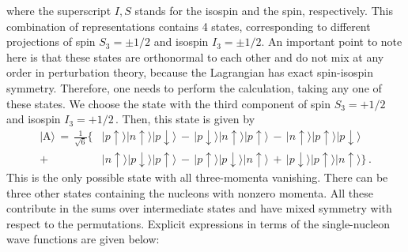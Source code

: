 \documentclass[12pt,prd,tightenlines,nofootinbib]{revtex4-2}
\begin{document}
where the superscript $I,S$ stands for the isospin and the spin, respectively.
This combination of representations contains 4 states, corresponding to different
projections of spin $S_3=\pm 1/2$ and isospin $I_3=\pm 1/2$.
An important point to note here
is that these states are orthonormal to each other and do not mix at any order in
perturbation theory, because the Lagrangian has exact spin-isospin symmetry.
Therefore, one needs to perform the calculation, taking any one of these states.
We choose the state with the third component of spin $S_3=+1/2\,$ and isospin $I_3=+1/2\,$.
Then, this state is given by
\begin{align}
    |\text{A} \rangle \, =\, \frac{1}{\sqrt{6}}\Big\{ &| p\uparrow\rangle| n\uparrow\rangle| p\downarrow\rangle \, -\, | p\downarrow\rangle| n\uparrow\rangle| p\uparrow\rangle\, -\, | n\uparrow\rangle| p\uparrow\rangle| p\downarrow\rangle \,\nonumber\\[2mm]
    +\, &| n\uparrow\rangle| p\downarrow\rangle| p\uparrow\rangle\, -\, | p\uparrow\rangle| p\downarrow\rangle| n\uparrow\rangle\,+\, | p\downarrow\rangle| p\uparrow\rangle| n\uparrow\rangle \Big\}\,.\label{state:A}
\end{align}
This is the only possible state with all three-momenta vanishing. There can be three
other states containing the nucleons with nonzero momenta. All these contribute
in the sums over intermediate states and have mixed symmetry with respect to the permutations. Explicit expressions in terms of the single-nucleon wave functions are given below:   
\end{document}
